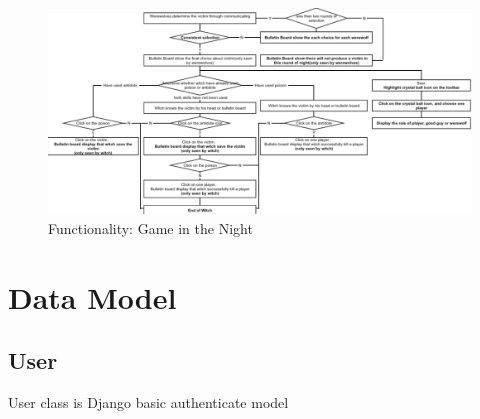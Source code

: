 \documentclass[11pt]{article}
\begin{document}
\begin{figure}
\centering
\includegraphics[width=0.9\linewidth, keepaspectratio]{func-gamenight.png}
\caption{Functionality: Game in the Night}
\label{fig:func-gamenight}
\end{figure}

\section{Data Model}
\subsection{User}
User class is Django basic authenticate model
\end{document}
